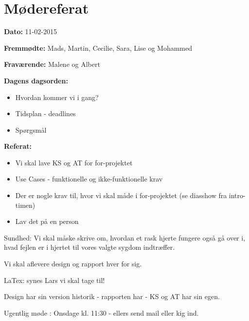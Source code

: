 \chapter{Mødereferat}

\textbf{Dato:} 11-02-2015

\textbf{Fremmødte:} Mads, Martin, Cecilie, Sara, Lise og Mohammed

\textbf{Fraværende:} Malene og Albert

\textbf{Dagens dagsorden:}
\begin{itemize}
	\item Hvordan kommer vi i gang? 
	\item Tidsplan - deadlines
	\item Spørgsmål
\end{itemize}

\textbf{Referat:}
\begin{itemize}
	\item Vi skal lave KS og AT for for-projektet
	\item Use Cases - funktionelle og ikke-funktionelle krav
	\item Der er nogle krav til, hvor vi skal måde i for-projektet (se diasshow fra intro-timen)
	\item Lav det på en person
\end{itemize} 

Sundhed: Vi skal måske skrive om, hvordan et rask hjerte fungere også gå over i, hvad fejlen er i hjertet til vores valgte sygdom indtræffer.  

Vi skal aflevere design og rapport hver for sig. 

LaTex: synes Lars vi skal tage til! 

Design har sin version historik - rapporten har - KS og AT har sin egen.  

Ugentlig møde : Onsdage kl. 11:30 - ellers send mail eller kig ind.  

